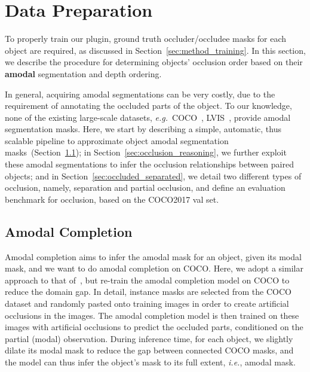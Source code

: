 \documentclass{bmvc2k}
\begin{document}
\section{Data Preparation}
\label{sec:generation_data}
\vspace{-0.1cm}

To properly train our plugin,
ground truth occluder/occludee masks for each object are required,
as discussed in Section~\ref{sec:method_training}.
In this section, we describe the procedure for determining objects' occlusion order based on their \textbf{amodal} segmentation and depth ordering.

In general, acquiring amodal segmentations can be very costly, 
due to the requirement of annotating the occluded parts of the object.
To our knowledge, none of the existing large-scale datasets, 
{\em e.g.}~COCO~\cite{coco_dataset}, LVIS~\cite{gupta2019lvis}, provide amodal segmentation masks. Here, we start by describing a simple, automatic, 
thus scalable pipeline to approximate object amodal segmentation masks~(Section~\ref{sec:amodal_completion});
in Section~\ref{sec:occlusion_reasoning}, 
we further exploit these amodal segmentations to infer the occlusion relationships between paired objects; and in Section~\ref{sec:occluded_separated}, 
we detail two different types of occlusion, namely, separation and partial occlusion,
and define an evaluation benchmark for occlusion, based on the COCO2017 val set. 
\vspace{-0.2cm}
\subsection{Amodal Completion}
\label{sec:amodal_completion}
\vspace{-0.1cm}

Amodal completion aims to infer the amodal mask for an object, given its modal mask, and we want to do amodal completion on COCO.
Here, we adopt a similar approach to that of~\cite{zhan2020self}, but re-train the amodal completion model on COCO to reduce the domain gap. 
In detail, instance masks are selected from the COCO dataset and randomly pasted onto  training images in order to create artificial occlusions in the images. The amodal completion
model is then trained on these images with artificial occlusions to predict the occluded parts, 
conditioned on the partial (modal) observation.
During inference time, 
for each object, we slightly dilate its modal mask to reduce the gap between connected COCO masks, and the model can thus infer the object's mask to its full extent, {\em i.e.}, amodal mask.
\end{document}
